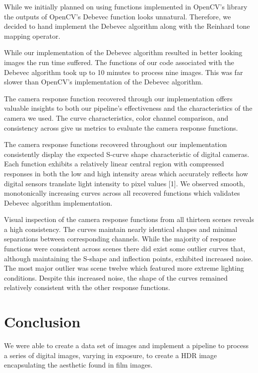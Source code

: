 \documentclass[
	a4paper, %
	10pt, %
	unnumberedsections, %
	twoside, %
]{LTJournalArticle}
\begin{document}
While we initially planned on using functions implemented in OpenCV’s library the outputs of OpenCV’s Debevec function looks unnatural. Therefore, we decided to hand implement the Debevec algorithm along with the Reinhard tone mapping operator.

While our implementation of the Debevec algorithm resulted in better looking images the run time suffered. The functions of our code associated with the Debevec algorithm took up to 10 minutes to process nine images. This was far slower than OpenCV’s implementation of the Debevec algorithm.  

The camera response function recovered through our implementation offers valuable insights to both our pipeline’s effectiveness and the characteristics of the camera we used. The curve characteristics, color channel comparison, and consistency across give us metrics to evaluate the camera response functions. 

The camera response functions recovered throughout our implementation consistently display the expected S-curve shape characteristic of digital cameras. Each function exhibits a relatively linear central region with compressed responses in both the low and high intensity areas which accurately reflects how digital sensors translate light intensity to pixel values [1]. We observed smooth, monotonically increasing curves across all recovered functions which validates Debevec algorithm implementation. 

Visual inspection of the camera response functions from all thirteen scenes reveals a high consistency. The curves maintain nearly identical shapes and minimal separations between corresponding channels. While the majority of response functions were consistent across scenes there did exist some outlier curves that, although maintaining the S-shape and inflection points, exhibited increased noise. The most major outlier was scene twelve which featured more extreme lighting conditions. Despite this increased noise, the shape of the curves remained relatively consistent with the other response functions.



\section{Conclusion}

We were able to create a data set of images and implement a pipeline to process a series of digital images, varying in exposure, to create a HDR image encapsulating the aesthetic found in film images. 
\end{document}
